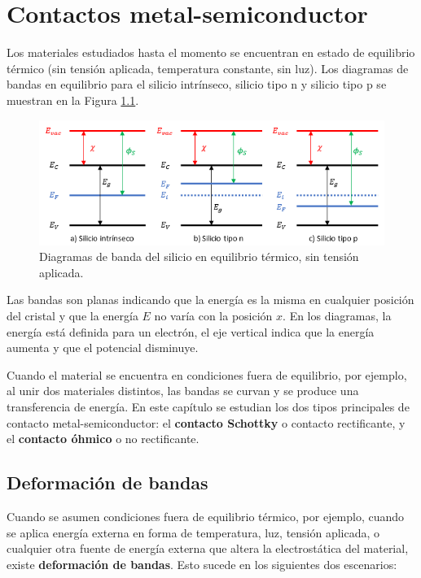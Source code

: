 \chapter{Contactos metal-semiconductor}

Los materiales estudiados hasta el momento se encuentran en estado de equilibrio térmico (sin tensión aplicada, temperatura constante, sin luz). Los diagramas de bandas en equilibrio para el silicio intrínseco, silicio tipo n y silicio tipo p se muestran en la Figura \ref{detalle_bandas_equilibrio}.

\begin{figure}[H]
    \centering
    \includegraphics{figuras/bandas_en_equilibrio_detalle.png}
    \caption{Diagramas de banda del silicio en equilibrio térmico, sin tensión aplicada.}
    \label{detalle_bandas_equilibrio}
\end{figure}

Las bandas son planas indicando que la energía es la misma en cualquier posición del cristal y que la energía $E$ no varía con la posición $x$. En los diagramas, la energía está definida para un electrón, el eje vertical indica que la energía aumenta y que el potencial disminuye.

Cuando el material se encuentra en condiciones fuera de equilibrio, por ejemplo, al unir dos materiales distintos, las bandas se curvan y se produce una transferencia de energía. En este capítulo se estudian los dos tipos principales de contacto metal-semiconductor: el \textbf{contacto Schottky} o contacto rectificante, y el \textbf{contacto óhmico} o no rectificante.


\newpage
\section{Deformación de bandas}

Cuando se asumen condiciones fuera de equilibrio térmico, por ejemplo, cuando se aplica energía externa en forma de temperatura, luz, tensión aplicada, o cualquier otra fuente de energía externa que altera la electrostática del material, existe \textbf{deformación de bandas}. Esto sucede en los siguientes dos escenarios:

